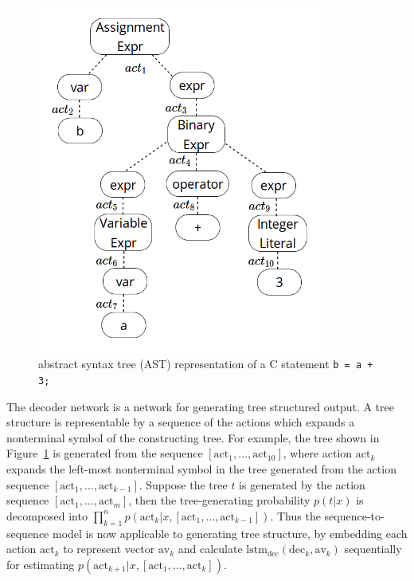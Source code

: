 \documentclass[11pt]{jarticle}
\begin{document}
\begin{figure}[]
	\begin{center}
	\includegraphics[height=11.5cm]{ast_zu.png}
	\end{center}
	\caption{abstract syntax tree (AST) representation of a C statement \texttt{b = a + 3;} }
	\label{fig:ast_zu}
\end{figure}

The decoder network is a network for generating tree structured output. 
A tree structure is representable by a sequence of the actions which expands a nonterminal symbol of the constructing tree.
For example, the tree shown in Figure~\ref{fig:ast_zu} is generated from the sequence $ [\mathrm{act}_1, \dots, \mathrm{act}_{10}] $, 
where action $ \mathrm{act}_k $ expands the left-most nonterminal symbol in the tree generated from the action sequence $ [\mathrm{act}_1, \dots, \mathrm{act}_{k-1}] $. 
Suppose the tree $t$ is generated by the action sequence $ [\mathrm{act}_1, \dots, \mathrm{act}_m] $, 
then the tree-generating probability $ p(t|x) $ is decomposed into $ \prod_{k=1}^n p(\mathrm{act}_k|x,[\mathrm{act}_1, \dots, \mathrm{act}_{k-1}]) $. 
Thus the sequence-to-sequence model is now applicable to generating tree structure, by embedding each action $\mathrm{act}_k$ to represent vector $\mathrm{av}_k$ and 
calculate $ \mathrm{lstm}_{\mathrm{dec}}(\mathrm{dec}_{k},\mathrm{av}_{k}) $ sequentially for estimating $p(\mathrm{act}_{k+1}|x,[\mathrm{act}_1, \dots, \mathrm{act}_{k}]) $.  
\end{document}
